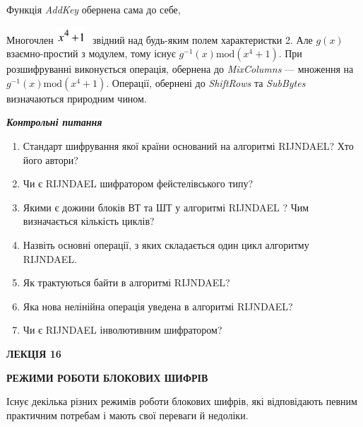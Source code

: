 Функція \textit{AddKey} обернена сама до себе,

Многочлен 
\includegraphics[width=0.4307in,height=0.25in]{crypt-img/crypt-img336.png}  $ $
звідний над будь-яким полем характеристки 2. Але  $g(x)$ взаємно-простий з
модулем, тому існує  $g^{-1}(x)\text{mod}(x^4+1)$. При розшифруванні
виконується операція, обернена до \textit{MixColumns} --- множення на 
$g^{-1}(x)\text{mod}(x^4+1)$. Операції, обернені до  \textit{ShiftRows
}та \textit{SubBytes }визначаються природним чином.


\bigskip


\bigskip

{\centering\bfseries\itshape
Контрольні питання
\par}


\bigskip


\bigskip

\liststyleWWviiiNumlviii
\begin{enumerate}
\item Стандарт шифрування якої країни оснований на алгоритмі RIJNDAEL? Хто його
автори?
\item Чи є  RIJNDAEL шифратором фейстелівського типу?
\item Якими є дожини блоків ВТ та ШТ у алгоритмі RIJNDAEL ? Чим визначається
кількість циклів?
\item Назвіть основні операції, з яких складається один цикл алгоритму RIJNDAEL.
\item Як трактуються байти в алгоритмі RIJNDAEL?
\item Яка нова нелінійна операція уведена в алгоритмі RIJNDAEL?
\item Чи є RIJNDAEL інволютивним шифратором?
\end{enumerate}

\bigskip


\bigskip


\bigskip

{\bfseries
ЛЕКЦІЯ  16}


\bigskip

{\centering\bfseries
РЕЖИМИ РОБОТИ БЛОКОВИХ ШИФРІВ
\par}


\bigskip


\bigskip

Існує декілька різних режимів роботи блокових шифрів, які відповідають певним
практичним потребам і мають свої переваги й недоліки.

